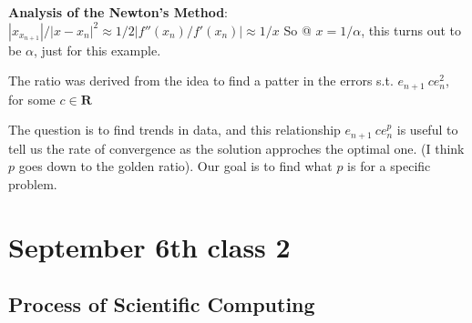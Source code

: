 \textbf{Analysis of the Newton's Method}:
$|x_{x_{n+1}}|/|x-x_n|^2 \approx 1/2 | f''(x_n)/f'(x_n)| \approx 1/x$
So @ $x = 1/\alpha$, this turns out to be $\alpha$, just for this
example.

The ratio was derived from the idea to find a patter in the errors
s.t. $e_{n+1} ~ c e_n^2$, for some $c\in \mathbf{R}$

The question is to find trends in data, and this relationship $e_{n+1}
~ ce_n^p$ is useful to tell us the rate of convergence as the solution
approches the optimal one. (I think $p$ goes down to the golden
ratio). Our goal is to find what $p$ is for a specific problem.
\pagebreak
\section{September 6th class 2}
\label{sec:class2}

\subsection{Process of Scientific Computing}

